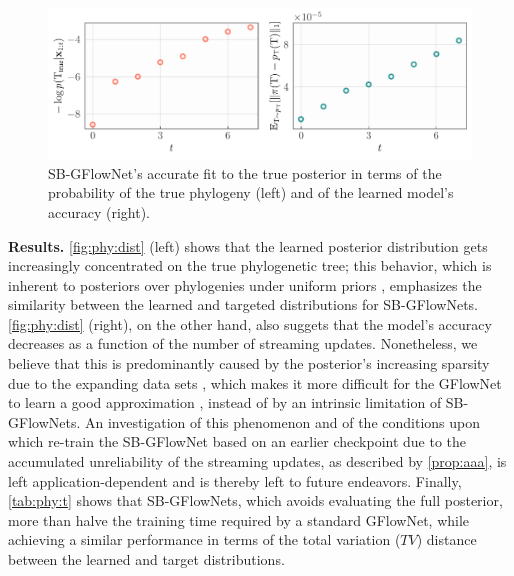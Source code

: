 \documentclass{article}
\newcommand{\pp}[1]{\vspace{0pt}\noindent\textbf{#1}}
\theoremstyle{plain}
\theoremstyle{definition}
\theoremstyle{remark}
\theoremstyle{remark}
\begin{document}
\captionsetup[figure]{font=small}
\begin{figure} 
    \centering
    \vspace{-12pt} 
    \includegraphics[width=\linewidth]{figures/phylogenetics_dist_approx.pdf}
    \caption{SB-GFlowNet's accurate fit to the true posterior in terms of the probability of the true phylogeny (left) and of the learned model's accuracy (right).}
    \label{fig:phy:dist}
    \vspace{-10pt} 
\end{figure}
\captionsetup[figure]{font=normal}
\pp{Results.} \autoref{fig:phy:dist} (left) shows that the learned posterior distribution gets increasingly concentrated on the true phylogenetic tree; this behavior, which is inherent to posteriors over phylogenies under uniform priors \cite{roychoudhury2015}, emphasizes the similarity between the learned and targeted distributions for SB-GFlowNets. \autoref{fig:phy:dist} (right), on the other hand, also suggets that the model's accuracy decreases as a function of the number of streaming updates. Nonetheless, we believe that this is predominantly caused by the posterior's increasing sparsity due to the expanding data sets \cite{roychoudhury2015}, which makes it more difficult for the GFlowNet to learn a good approximation \cite{deleu2022bayesian}, instead of by an intrinsic limitation of SB-GFlowNets. %
An investigation of this phenomenon and of the conditions upon which re-train the SB-GFlowNet based on an earlier checkpoint due to the accumulated unreliability of the streaming updates, as described by \autoref{prop:aaa}, is left application-dependent and is thereby left to future endeavors. 
% 
Finally, \autoref{tab:phy:t} shows that SB-GFlowNets, which avoids evaluating the full posterior, more than halve the training time required by a standard GFlowNet, while achieving a similar performance in terms of the total variation ($TV$) distance between the learned and target distributions.  
\end{document}
